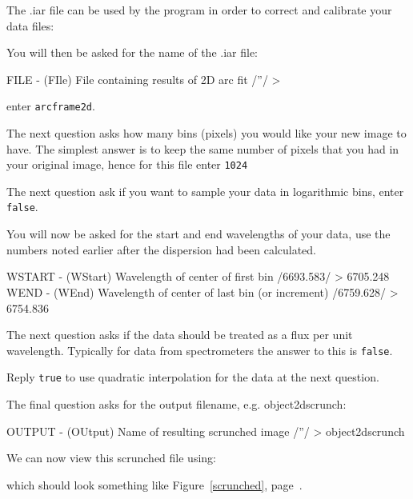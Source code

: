 \documentclass[twoside,11pt]{starlink}
\providecommand{\scspec}[2]{#1}
\begin{document}
The .iar file can be used by the 
 program in order to correct
and calibrate your data files:

{\scspec{\small}{ }
\begin{terminalv}
\end{terminalv}
}
You will then be asked for the name of the .iar file:
{\scspec{\small}{ }
\begin{terminalv}
FILE - (FIle) File containing results of 2D arc fit /''/ >
\end{terminalv}
}enter \texttt{arcframe2d}.

The next question asks how many bins (pixels) you would like your new
image to have. The simplest answer is to keep the same number of
pixels that you had in your original image, hence for this file enter
\texttt{1024}

The next question ask if you want to sample your data in logarithmic
bins, enter \texttt{false}.

You will now be asked for the start and end wavelengths of your data,
use the numbers noted earlier after the dispersion had been
calculated.
{
\scspec{\small}{ }
\begin{terminalv}
WSTART - (WStart) Wavelength of center of first bin /6693.583/ > 6705.248
WEND - (WEnd) Wavelength of center of last bin (or increment) /6759.628/ > 6754.836
\end{terminalv}
}

The next question asks if the data should be treated as a flux per
unit wavelength. Typically for data from spectrometers the answer to
this is \texttt{false}.

Reply \texttt{true} to use quadratic interpolation for the data at the next question.

The final question asks for the output filename, e.g. object2dscrunch:
{\scspec{\small}{ }
\begin{terminalv}
OUTPUT - (OUtput) Name of resulting scrunched image /''/ > object2dscrunch
\end{terminalv}
}

We can now view this scrunched file using:

{\scspec{\small}{ }
\begin{terminalv}
\end{terminalv}
}

which should look something like \scspec{Figure~\ref{scrunched},
page~\pageref{scrunched}.}{the figure below.}
\end{document}
